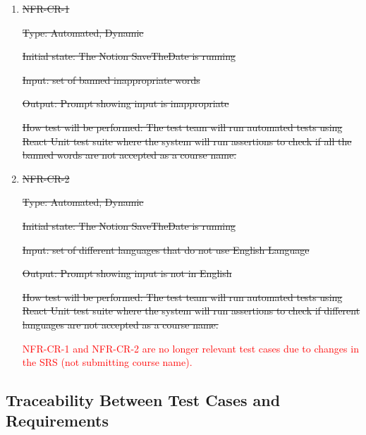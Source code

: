 \documentclass[12pt, titlepage]{article}
\begin{document}
\begin{enumerate}

\item{\sout{NFR-CR-1}\\}

\sout{Type: Automated, Dynamic}

\sout{Initial state: The Notion SaveTheDate is running}

\sout{Input: set of banned inappropriate words} 

\sout{Output: Prompt showing input is inappropriate}

\sout{How test will be performed: The test team will run automated tests using React Unit test suite where the system will run assertions to check if all the banned words are not accepted as a course name.}

\item{\sout{NFR-CR-2}\\}

\sout{Type: Automated, Dynamic}

\sout{Initial state: The Notion SaveTheDate is running} 

\sout{Input: set of different languages that do not use English Language} 

\sout{Output: Prompt showing input is not in English} 

\sout{How test will be performed: The test team will run automated tests using React Unit test suite where the system will run assertions to check if different languages are not accepted as a course name.}

\textcolor{red}{NFR-CR-1 and NFR-CR-2 are no longer relevant test cases due to changes in the SRS (not submitting course name).}

\end{enumerate}

\newpage

\subsection{Traceability Between Test Cases and Requirements}
\end{document}

